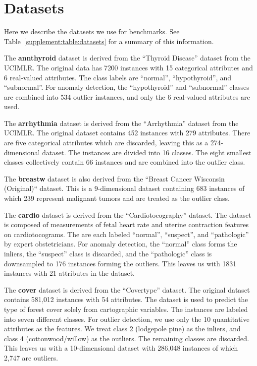 \documentclass{article}
\begin{document}
\renewcommand{\thetable}{S\arabic{table}}

\renewcommand{\thefigure}{S\arabic{figure}}

\section{Datasets}
\label{supplement:sec:datasets}

Here we describe the datasets we use for benchmarks.
See Table~\ref{supplement:table:datasets} for a summary of this information.

The \textbf{annthyroid} dataset is derived from the ``Thyroid Disease'' dataset from the UCIMLR\@.
The original data has 7200 instances with 15 categorical attributes and 6 real-valued attributes.
The class labels are ``normal'', ``hypothyroid'', and ``subnormal''.
For anomaly detection, the ``hypothyroid'' and ``subnormal'' classes are combined into 534 outlier instances, and only the 6 real-valued attributes are used.

The \textbf{arrhythmia} dataset is derived from the ``Arrhythmia'' dataset from the UCIMLR\@.
The original dataset contains 452 instances with 279 attributes.
There are five categorical attributes which are discarded, leaving this as a 274-dimensional dataset.
The instances are divided into 16 classes.
The eight smallest classes collectively contain 66 instances and are combined into the outlier class.

The \textbf{breastw} dataset is also derived from the ``Breast Cancer Wisconsin (Original)`` dataset.
This is a 9-dimensional dataset containing 683 instances of which 239 represent malignant tumors and are treated as the outlier class.

The \textbf{cardio} dataset is derived from the ``Cardiotocography'' dataset.
The dataset is composed of measurements of fetal heart rate and uterine contraction features on cardiotocograms.
The are each labeled ``normal'', ``suspect'', and ``pathologic'' by expert obstetricians.
For anomaly detection, the ``normal'' class forms the inliers, the ``suspect'' class is discarded, and the ``pathologic'' class is downsampled to 176 instances forming the outliers.
This leaves us with 1831 instances with 21 attributes in the dataset.

The \textbf{cover} dataset is derived from the ``Covertype'' dataset.
The original dataset contains 581,012 instances with 54 attributes.
The dataset is used to predict the type of forest cover solely from cartographic variables.
The instances are labeled into seven different classes.
For outlier detection, we use only the 10 quantitative attributes as the features.
We treat class 2 (lodgepole pine) as the inliers, and class 4 (cottonwood/willow) as the outliers.
The remaining classes are discarded.
This leaves us with a 10-dimensional dataset with 286,048 instances of which 2,747 are outliers.
\end{document}
